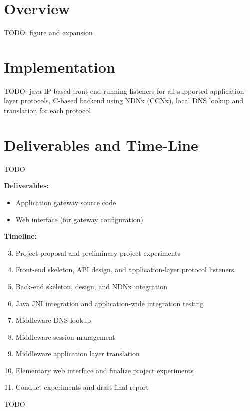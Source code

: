 \documentclass[10pt]{article}
\begin{document}
\section{Overview}
TODO: figure and expansion


\section{Implementation}
TODO: java IP-based front-end running listeners for all supported application-layer protocols, C-based backend using NDNx (CCNx), local DNS lookup and translation for each protocol

\section{Deliverables and Time-Line}
TODO

{\bf Deliverables:}
\begin{itemize}
	\item Application gateway source code
	\item Web interface (for gateway configuration)
\end{itemize}

{\bf Timeline:}
\begin{enumerate}[{\bf Week} 1:]
	\setcounter{enumi}{2}
	\item Project proposal and preliminary project experiments
	\item Front-end skeleton, API design, and application-layer protocol listeners
	\item Back-end skeleton, design, and NDNx integration
	\item Java JNI integration and application-wide integration testing
	\item Middleware DNS lookup
	\item Middleware session management
	\item Middleware application layer translation
	\item Elementary web interface and finalize project experiments
	\item Conduct experiments and draft final report 
\end{enumerate}


\begin{thebibliography}{[MT1]}

 TODO

\end{thebibliography}
\end{document}
